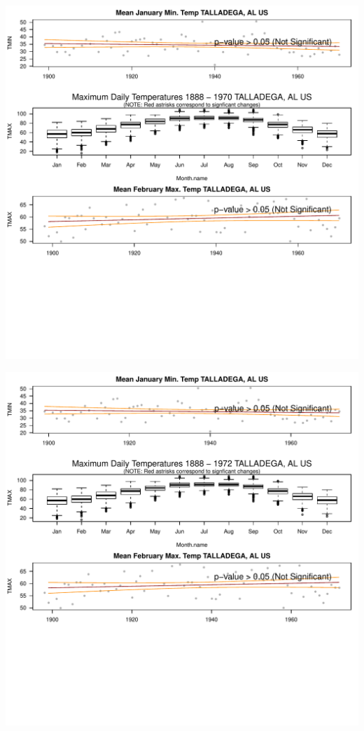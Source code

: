 \documentclass{article}\usepackage[]{graphicx}\usepackage[]{color}
\makeatletter
\def\maxwidth{ %
  \ifdim\Gin@nat@width>\linewidth
    \linewidth
  \else
    \Gin@nat@width
  \fi
}
\newenvironment{knitrout}{}{} %
\makeatother
\begin{document}
\begin{knitrout}
\includegraphics[width=\maxwidth]{figure/static_template-31} 

\includegraphics[width=\maxwidth]{figure/static_template-32} 


\end{knitrout}
\end{document}
